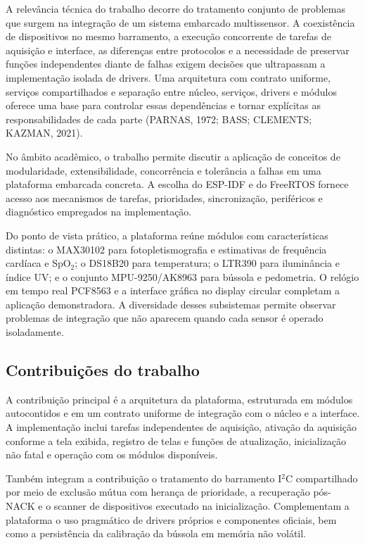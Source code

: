 \documentclass[a4paper,12pt]{article}
\begin{document}
A relev\^ancia t\'ecnica do trabalho decorre do tratamento conjunto de problemas que surgem na integra\c{c}\~ao de um sistema embarcado multissensor. A coexist\^encia de dispositivos no mesmo barramento, a execu\c{c}\~ao concorrente de tarefas de aquisi\c{c}\~ao e interface, as diferen\c{c}as entre protocolos e a necessidade de preservar fun\c{c}\~oes independentes diante de falhas exigem decis\~oes que ultrapassam a implementa\c{c}\~ao isolada de drivers. Uma arquitetura com contrato uniforme, servi\c{c}os compartilhados e separa\c{c}\~ao entre n\'ucleo, servi\c{c}os, drivers e m\'odulos oferece uma base para controlar essas depend\^encias e tornar expl\'icitas as responsabilidades de cada parte (PARNAS, 1972; BASS; CLEMENTS; KAZMAN, 2021).

No \^ambito acad\^emico, o trabalho permite discutir a aplica\c{c}\~ao de conceitos de modularidade, extensibilidade, concorr\^encia e toler\^ancia a falhas em uma plataforma embarcada concreta. A escolha do ESP-IDF e do FreeRTOS fornece acesso aos mecanismos de tarefas, prioridades, sincroniza\c{c}\~ao, perif\'ericos e diagn\'ostico empregados na implementa\c{c}\~ao.

Do ponto de vista pr\'atico, a plataforma re\'une m\'odulos com caracter\'isticas distintas: o MAX30102 para fotopletismografia e estimativas de frequ\^encia card\'iaca e SpO$_2$; o DS18B20 para temperatura; o LTR390 para ilumin\^ancia e \'indice UV; e o conjunto MPU-9250/AK8963 para b\'ussola e pedometria. O rel\'ogio em tempo real PCF8563 e a interface gr\'afica no display circular completam a aplica\c{c}\~ao demonstradora. A diversidade desses subsistemas permite observar problemas de integra\c{c}\~ao que n\~ao aparecem quando cada sensor \'e operado isoladamente.

\subsection{Contribui\c{c}\~oes do trabalho}

A contribui\c{c}\~ao principal \'e a arquitetura da plataforma, estruturada em m\'odulos autocontidos e em um contrato uniforme de integra\c{c}\~ao com o n\'ucleo e a interface. A implementa\c{c}\~ao inclui tarefas independentes de aquisi\c{c}\~ao, ativa\c{c}\~ao da aquisi\c{c}\~ao conforme a tela exibida, registro de telas e fun\c{c}\~oes de atualiza\c{c}\~ao, inicializa\c{c}\~ao n\~ao fatal e opera\c{c}\~ao com os m\'odulos dispon\'iveis.

Tamb\'em integram a contribui\c{c}\~ao o tratamento do barramento I$^2$C compartilhado por meio de exclus\~ao m\'utua com heran\c{c}a de prioridade, a recupera\c{c}\~ao p\'os-NACK e o scanner de dispositivos executado na inicializa\c{c}\~ao. Complementam a plataforma o uso pragm\'atico de drivers pr\'oprios e componentes oficiais, bem como a persist\^encia da calibra\c{c}\~ao da b\'ussola em mem\'oria n\~ao vol\'atil.
\end{document}
